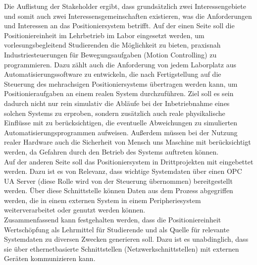 \documentclass[../../../Bachelorarbeit.tex]{subfiles}
\begin{document}
Die Auflistung der Stakeholder ergibt, dass grundsätzlich zwei Interessengebiete und somit auch zwei Interessensgemeinschaften existieren, was die Anforderungen und Interessen an das Positioniersystem betrifft. Auf der einen Seite soll die Positioniereinheit im Lehrbetrieb im Labor eingesetzt werden, um vorlesungsbegleitend Studierenden die Möglichkeit zu bieten, praxisnah Industriesteuerungen für Bewegungsaufgaben (Motion Controlling) zu programmieren. Dazu zählt auch die Anforderung von jedem Laborplatz aus Automatisierungssoftware zu entwickeln, die nach Fertigstellung auf die Steuerung des mehrachsigen Positioniersystems übertragen werden kann, um Positionieraufgaben an einem realen System durchzuführen. Ziel soll es sein dadurch nicht nur rein simulativ die Abläufe bei der Inbetriebnahme eines solchen Systems zu erproben, sondern zusätzlich auch reale physikalische Einflüsse mit zu berücksichtigen, die eventuelle Abweichungen zu simulierten Automatisierungsprogrammen aufweisen. Außerdem müssen bei der Nutzung realer Hardware auch die Sicherheit von Mensch uns Maschine mit berücksichtigt werden, da Gefahren durch den Betrieb des Systems auftreten können.\\
Auf der anderen Seite soll das Positioniersystem in Drittprojekten mit eingebettet werden. Dazu ist es von Relevanz, dass wichtige Systemdaten über einen OPC UA Server (diese Rolle wird von der Steuerung übernommen) bereitgestellt werden. Über diese Schnittstelle können Daten aus dem Prozess abgegriffen werden, die in einem externen System \bzw in einem Peripheriesystem weiterverarbeitet oder genutzt werden können.\\
Zusammenfassend kann festgehalten werden, dass die Positioniereinheit Wertschöpfung als Lehrmittel für Studierende und als Quelle für relevante Systemdaten zu diversen Zwecken generieren soll. Dazu ist es unabdinglich, dass sie über ethernetbasierte Schnittstellen (Netzwerkschnittstellen) mit externen Geräten kommunizieren kann. 
\end{document}
